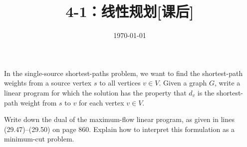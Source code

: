 \documentclass[11pt, a4paper, UTF8]{ctexart}
\title{4-1：线性规划[课后]}
\date{\today}
\begin{document}
\maketitle
\noplagiarism

\beginthishw
\begin{problem}[TC 29.2-3]
In the single-source shortest-paths problem, we want to find the shortest-path weights from a source vertex $s$ to all vertices $v\in V$. Given a graph $G$, write a linear program for which the solution has the property that $d_v$ is the shortest-path
weight from $s$ to $v$ for each vertex $v\in V$.
\end{problem}
\begin{solution}
    
\end{solution}




\begin{problem}[TC 29.4-3]
    Write down the dual of the maximum-flow linear program, as given in lines
    (29.47)–(29.50) on page 860. Explain how to interpret this formulation as a
    minimum-cut problem.
\end{problem}
\begin{solution}
    
\end{solution}
\end{document}
